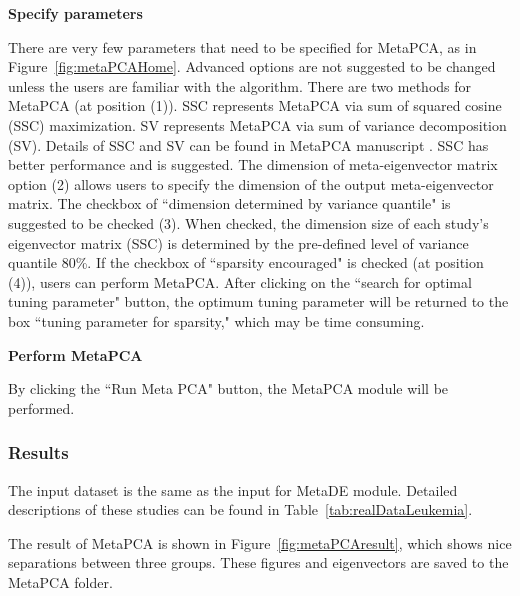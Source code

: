 \begin{steps}

\item \textbf{Specify parameters} 

There are very few parameters that need to be specified for MetaPCA, as in Figure~\ref{fig:metaPCAHome}.
Advanced options are not suggested to be changed unless the users are familiar with the algorithm.
There are two methods for MetaPCA (at position {\color{red} (1)}). 
SSC represents MetaPCA via sum of squared cosine (SSC) maximization.
SV represents MetaPCA via sum of variance decomposition (SV).
Details of SSC and SV can be found in MetaPCA manuscript \citep{kim2017meta}.
SSC has better performance and is suggested.
The dimension of meta-eigenvector matrix option {\color{red} (2)} allows users to specify the dimension of the output meta-eigenvector matrix.
The checkbox of ``dimension determined by variance quantile" is suggested to be checked {\color{red} (3)}.
When checked, the dimension size of each study's eigenvector matrix (SSC) is determined  by the pre-defined level of variance quantile 80\%.
If the checkbox of ``sparsity encouraged" is checked (at position {\color{red} (4)}), users can perform MetaPCA.
After clicking on the ``search for optimal tuning parameter" button, the optimum tuning parameter will be returned to the box ``tuning parameter for sparsity," 
which may be time consuming.

\item \textbf{Perform MetaPCA} 

By clicking the ``Run Meta PCA" button, the MetaPCA module will be performed.


\end{steps}


\subsubsection{Results}
The input dataset is the same as the input for MetaDE module.
Detailed descriptions of these studies can be found in Table~\ref{tab:realDataLeukemia}. 

The result of MetaPCA is shown in Figure~\ref{fig:metaPCAresult},
which shows nice separations between three groups.
These figures and eigenvectors are saved to the MetaPCA folder.

